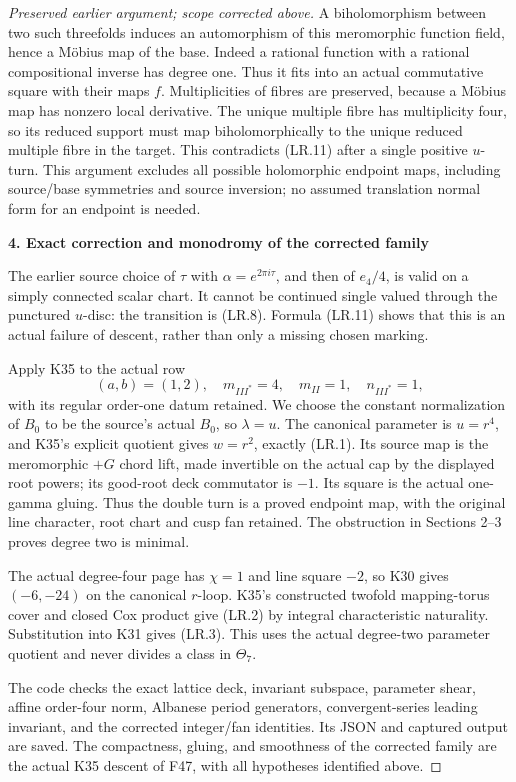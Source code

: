 \begin{proof}[Preserved earlier argument; scope corrected above]
A biholomorphism between two such threefolds induces an automorphism
of this meromorphic function field, hence a Möbius map of the base.
Indeed a rational function with a rational compositional inverse
has degree one. Thus it fits into an actual commutative square with
their maps \(f\). Multiplicities of fibres are preserved, because a
Möbius map has nonzero local derivative. The unique multiple fibre
has multiplicity four, so its reduced support must map biholomorphically
to the unique reduced multiple fibre in the target. This contradicts
(LR.11) after a single positive \(u\)-turn. This argument excludes
all possible holomorphic endpoint maps, including source/base
symmetries and source inversion; no assumed translation normal form
for an endpoint is needed.

\par

\medskip\noindent\textbf{4. Exact correction and monodromy of the corrected family}

\par\nobreak

The earlier source choice of \(\tau\) with
\(\alpha=e^{2\pi i\tau}\), and then of \(e_4/4\), is valid on a
simply connected scalar chart. It cannot be continued single valued
through the punctured \(u\)-disc: the transition is (LR.8). Formula
(LR.11) shows that this is an actual failure of descent, rather than
only a missing chosen marking.

Apply K35 to the actual row
\[
 (a,b)=(1,2),\quad m_{III^*}=4,\quad m_{II}=1,
 \quad n_{III^*}=1,
\]
with its regular order-one datum retained. We choose the constant
normalization of \(B_0\) to be the source's actual \(B_0\), so
\(\lambda=u\). The canonical parameter is \(u=r^4\), and K35's
explicit quotient gives \(w=r^2\), exactly (LR.1). Its source map is
the meromorphic \(+G\) chord lift, made invertible on the actual
cap by the displayed root powers; its good-root deck commutator is
\(-1\). Its square is the actual one-gamma gluing. Thus the double
turn is a proved endpoint map, with the original line character,
root chart and cusp fan retained. The obstruction in Sections 2--3
proves degree two is minimal.

The actual degree-four page has \(\chi=1\) and line square \(-2\),
so K30 gives \((-6,-24)\) on the canonical \(r\)-loop. K35's
constructed twofold mapping-torus cover and closed Cox product give
(LR.2) by integral characteristic naturality. Substitution into K31
gives (LR.3). This uses the actual degree-two parameter quotient and
never divides a class in \(\Theta_7\).

The code  checks the exact
lattice deck, invariant subspace, parameter shear, affine order-four
norm, Albanese period generators, convergent-series leading invariant,
and the corrected integer/fan identities. Its JSON and captured output
are saved. The compactness, gluing, and smoothness of the corrected
family are the actual K35 descent of F47, with all hypotheses identified
above.

\end{proof}
